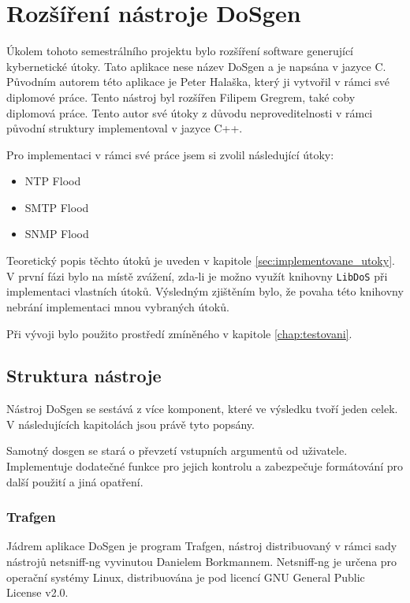 \chapter{Rozšíření nástroje DoSgen}
Úkolem tohoto semestrálního projektu bylo rozšíření software generující kybernetické útoky. Tato aplikace nese název DoSgen a je napsána v jazyce C. Původním autorem této aplikace je Peter Halaška, který ji vytvořil v rámci své diplomové práce. Tento nástroj byl rozšířen Filipem Gregrem, také coby diplomová práce. Tento autor své útoky z důvodu neproveditelnosti v rámci původní struktury implementoval v jazyce C++.

Pro implementaci v rámci své práce jsem si zvolil následující útoky:
\begin{itemize}
	\item{NTP Flood}
	\item{SMTP Flood}
	\item{SNMP Flood}
\end{itemize}

Teoretický popis těchto útoků je uveden v kapitole \ref{sec:implementovane_utoky}. V první fázi bylo na místě zvážení, zda-li je možno využít knihovny \texttt{LibDoS} při implementaci vlastních útoků. Výsledným zjištěním bylo, že povaha této knihovny nebrání implementaci mnou vybraných útoků.

Při vývoji bylo použito prostředí zmíněného v kapitole \ref{chap:testovani}.

\section{Struktura nástroje}
Nástroj DoSgen se sestává z více komponent, které ve výsledku tvoří jeden celek. V následujících kapitolách jsou právě tyto popsány.

Samotný dosgen se stará o převzetí vstupních argumentů od uživatele. Implementuje dodatečné funkce pro jejich kontrolu a zabezpečuje formátování pro další použití a jiná opatření.

\subsection{Trafgen}
Jádrem aplikace DoSgen je program Trafgen, nástroj distribuovaný v rámci sady nástrojů netsniff-ng vyvinutou Danielem Borkmannem. Netsniff-ng je určena pro operační systémy Linux, distribuována je pod licencí GNU General Public License v2.0.

